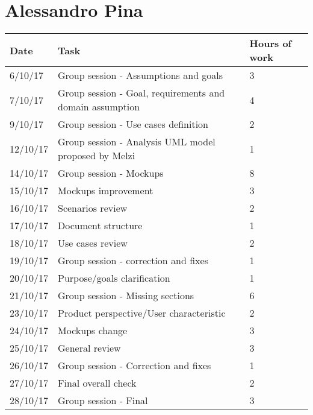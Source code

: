 \section{Alessandro Pina}
\begin{table}[H]
	\begin{tabular}{ p{2cm} p{8cm} p{3cm}}
	Date & Task & Hours of work\\
	\hline
	6/10/17  & Group session - Assumptions and goals & 3 \\
	7/10/17  & Group session - Goal, requirements and domain assumption & 4 \\
	9/10/17  & Group session - Use cases definition & 2 \\
	12/10/17  & Group session - Analysis UML model proposed by Melzi & 1 \\
	14/10/17  & Group session - Mockups & 8 \\
	15/10/17  & Mockups improvement & 3 \\
	16/10/17  & Scenarios review & 2 \\
	17/10/17  & Document structure & 1  \\
	18/10/17  & Use cases review & 2 \\
	19/10/17  & Group session - correction and fixes & 1 \\
	20/10/17  & Purpose/goals clarification & 1 \\
	21/10/17  & Group session - Missing sections & 6 \\
	23/10/17  & Product perspective/User characteristic & 2 \\
	24/10/17  & Mockups change & 3 \\
	25/10/17  & General review & 3 \\
	26/10/17  & Group session - Correction and fixes & 1 \\
	27/10/17  & Final overall check & 2 \\
	28/10/17  & Group session - Final  & 3 \\
	\end{tabular}
\end{table}

